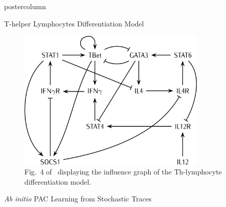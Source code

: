 \documentclass[final,hyperref={pdfpagelabels=false},xcolor=dvipsnames]{beamer}
\newlength{\columnheight}
\begin{document}
\begin{frame}
\begin{columns}
    \begin{column}{.49\textwidth}
      \begin{beamercolorbox}[center,wd=\textwidth]{postercolumn}
        \begin{minipage}[T]{.95\textwidth} %
          \parbox[t][\columnheight]{\textwidth}{ %
            \begin{block}{T-helper Lymphocytes Differentiation Model}

\begin{figure}[htbp]
   \centering
   \includegraphics[width=0.8\textwidth]{th_net_clean.png}
   \caption{Fig.~4 of~\cite{RRMTC06tcsb} displaying the influence graph of the Th-lymphocyte
   differentiation model.\label{fig:lympho}}
\end{figure}

\begin{listfig}[htb]
   
   \caption{Biocham influence system for the lymphocyte differentiation of
   example~\ref{ex:lympho}.}\label{lst:lympho}
\end{listfig}

	    \end{block}
            \vfill
            \begin{block}{\emph{Ab initio} PAC Learning from Stochastic Traces}


\end{block}}
\end{minipage}
\end{beamercolorbox}
\end{column}
\end{columns}
\end{frame}
\end{document}
